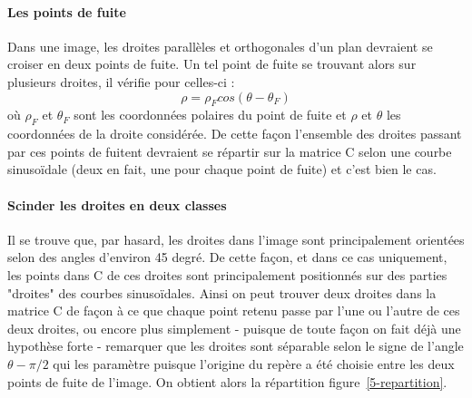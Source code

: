 \documentclass{article}
\begin{document}
\paragraph{Les points de fuite}
Dans une image, les droites parallèles et orthogonales d'un plan devraient se croiser en deux points de fuite. Un tel point de fuite se trouvant alors sur plusieurs droites, il vérifie pour celles-ci :
\[\rho = \rho_Fcos(\theta - \theta_F)\]
où $\rho_F$ et $\theta_F$ sont les coordonnées polaires du point de fuite et $\rho$ et $\theta$ les coordonnées de la droite considérée. De cette façon l'ensemble des droites passant par ces points de fuitent devraient se répartir sur la matrice C selon une courbe sinusoïdale (deux en fait, une pour chaque point de fuite) et c'est bien le cas.

\paragraph{Scinder les droites en deux classes}
Il se trouve que, par hasard, les droites dans l'image sont principalement orientées selon des angles d'environ 45 degré. De cette façon, et dans ce cas uniquement, les points dans C de ces droites sont principalement positionnés sur des parties "droites" des courbes sinusoïdales. Ainsi on peut trouver deux droites dans la matrice C de façon à ce que chaque point retenu passe par l'une ou l'autre de ces deux droites, ou encore plus simplement - puisque de toute façon on fait déjà une hypothèse forte - remarquer que les droites sont séparable selon le signe de l'angle $\theta - \pi/2$ qui les paramètre puisque l'origine du repère a été choisie entre les deux points de fuite de l'image. On obtient alors la répartition figure~\ref{5-repartition}.
\end{document}
